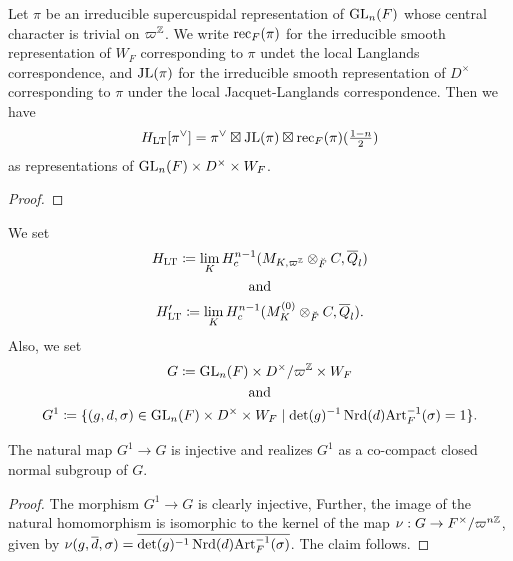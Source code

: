 \documentclass[../main.tex]{subfiles}
\begin{document}
\begin{thm}
  Let $\pi$ be an irreducible supercuspidal representation of $\operatorname{GL}_n(F)$ whose central
  character is trivial on $\varpi^{\mathbb{Z}}$. We write $\mathrm{rec}_F(\pi)$ for the irreducible 
  smooth representation of $W_F$ corresponding to $\pi$ undet the local Langlands
  correspondence, and $\mathrm{JL}(\pi)$ for the irreducible smooth representation of
  $D^\times$ corresponding to $\pi$ under the local Jacquet-Langlands correspondence.
  Then we have 
  \begin{equation*}
    H_{\mathrm{LT}}[\pi^\vee] = \pi^\vee \boxtimes \mathrm{JL}(\pi) \boxtimes \mathrm{rec}_F(\pi)(\tfrac{1-n}2)
  \end{equation*}
  as representations of $\operatorname{GL}_n(F) \times D^\times \times W_F$. 
\begin{proof}
\end{proof}
\end{thm}


We set 
\begin{equation} \label{eq:DefHLTHprLT}
  \begin{gathered}
  H_{\mathrm{LT}} \coloneqq \lim_K H^{n-1}_c(M_{K, \varpi^{\mathbb{Z}}} \otimes_{\breve F} C, \overline Q_l)
  \\ \text{and} \\
  H_{\mathrm{LT}}' \coloneqq \lim_K H^{n-1}_c(M_{K}^{(0)} \otimes_{\breve F} C, \overline Q_l).
  \end{gathered}
\end{equation}
Also, we set 
\begin{equation}\label{eq:DefGandG1}
\begin{gathered} 
  G \coloneqq \operatorname{GL}_n(F) \times D^\times/\varpi^{\mathbb{Z}} \times W_F \\  \text{ and } \\
  G^1 \coloneqq \{(g,d,\sigma) \in \operatorname{GL}_n(F) \times D^\times \times W_F \mid 
  \det(g)^{-1} \operatorname{Nrd}(d) \mathrm{Art}_F^{-1}(\sigma) = 1\}.
\end{gathered}
\end{equation}
\begin{lem}\label{lem:G1subG}
  The natural map $G^1 \to G$ is injective and realizes $G^1$ as a co-compact closed
  normal subgroup of $G$.
\begin{proof}
  The morphism $G^1 \to G$ is clearly injective, Further, the image of the natural
  homomorphism is isomorphic to the kernel of the map 
  $\nu: G \to F^\times/\varpi^{n\mathbb{Z}}$, given by $\nu(g, \overline d, \sigma) = 
  \overline{\det(g)^{-1}\operatorname{Nrd}(d)\mathrm{Art}_F^{-1}(\sigma)}$. The claim follows.
\end{proof}
\end{lem}
\end{document}
